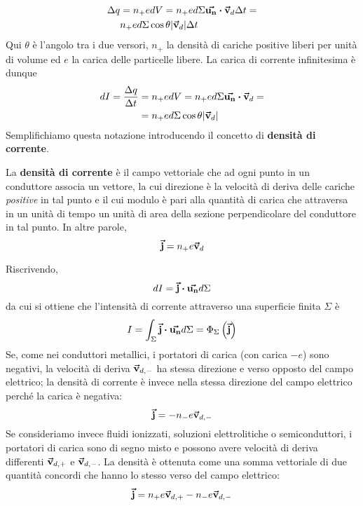 \begin{align*}
	\Delta q&=n_{+}edV=n_{+}e d\Sigma\vba{u_n}\vdot\vba{v}_d \Delta t=\\
	&n_{+}e  d\Sigma\cos\theta\abs{\vba{v}_d}\Delta t
\end{align*}
Qui $\theta$ è l'angolo tra i due versori, $n_{+}$ la densità di cariche positive liberi per unità di volume ed $e$ la carica delle particelle libere. La carica di corrente infinitesima è dunque
\begin{align*}
	dI=\frac{\Delta q}{\Delta t}&=n_{+}edV=n_{+}e d\Sigma\vba{u_n}\vdot\vba{v}_d=\\
	&=n_{+}e  d\Sigma\cos\theta\abs{\vba{v}_d}
\end{align*}
Semplifichiamo questa notazione introducendo il concetto di \textbf{densità di corrente}. 
\begin{define}
	La \textbf{densità di corrente} è il campo vettoriale che ad ogni punto in un conduttore associa un vettore, la cui direzione è la velocità di deriva delle cariche \textit{positive} in tal punto e il cui modulo è pari alla quantità di carica che attraversa in un unità di tempo un unità di area della sezione perpendicolare del conduttore in tal punto. In altre parole,
	\begin{equation}
		\vb*{\va{j}}=n_{+}e\vb*{\va{v}}_d
	\end{equation}
\end{define}
Riscrivendo,
\begin{equation*}
	dI=\vba{j}\vdot \vba{u_n}d\Sigma
\end{equation*}
da cui si ottiene che l'intensità di corrente attraverso una superficie finita $\Sigma$ è
\begin{equation}
	I=\int_{\Sigma}\vba{j}\vdot \vba{u_n}d\Sigma=\Phi_{\Sigma}\left(\vba{j}\right)
\end{equation}
Se, come nei conduttori metallici, i portatori di carica (con carica $-e$) sono negativi, la velocità di deriva $\vb*{\va{v}}_{d,-}$ ha stessa direzione e verso opposto del campo elettrico; la densità di corrente è invece nella stessa direzione del campo elettrico perché la carica è negativa:
\begin{equation}
	\vb*{\va{j}}=-n_{-}e\vb*{\va{v}}_{d,-}
\end{equation}
Se consideriamo invece fluidi ionizzati, soluzioni elettrolitiche o semiconduttori, i portatori di carica sono di segno misto e possono avere velocità di deriva differenti $\vb*{\va{v}}_{d,+}$ e $\vb*{\va{v}}_{d,-}$. La densità è ottenuta come una somma vettoriale di due quantità concordi che hanno lo stesso verso del campo elettrico:
\begin{equation}
	\vb*{\va{j}}=n_{+}e\vb*{\va{v}}_{d,+}-n_{-}e\vb*{\va{v}}_{d,-}
\end{equation}
